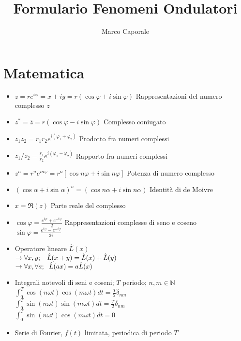 \documentclass[a4paper]{article}
\newcommand*{\field}[1]{\mathbb{#1}}
\begin{document}
	\title{Formulario Fenomeni Ondulatori}
	\author{Marco Caporale}
	\date{}
	\maketitle
\section{Matematica}
	\begin{itemize}
		\item $z = r e^{i \varphi} = x + iy = r(\cos \varphi + i \sin \varphi)$ Rappresentazioni del numero complesso $z$
		\item $z^*=\overline{z} = r(\cos \varphi - i \sin \varphi)$ Complesso coniugato
		\item $z_1 z_2 = r_1 r_2 e^{i (\varphi_1 +\varphi_2)}$ Prodotto fra numeri complessi
		\item $z_1/z_2 = \frac{r_1}{r_2} e^{i (\varphi_1 -\varphi_2)}$ Rapporto fra numeri complessi
		\item $z^n = r^n e^{in \varphi} = r^n [\cos n\varphi + i \sin n \varphi]$ Potenza di numero complesso
		\item $(\cos \alpha + i \sin \alpha)^n = (\cos n \alpha + i \sin n \alpha)$ Identità di de Moivre
		\item $x = \Re (z)$ Parte reale del complesso
		\item $\cos \varphi = \frac{e^{i \varphi}+e^{-i \varphi}}{2}$ Rappresentazioni complesse di seno e coseno\\
		$\sin \varphi = \frac{e^{i \varphi}-e^{-i \varphi}}{2i}$
		\item Operatore lineare $\hat{L}(x)$\\
		$\rightarrow \forall x,y; \hspace{3mm} \hat{L}(x+y)=\hat{L}(x) +\hat{L}(y)$\\
		$\rightarrow \forall x, \forall a; \hspace{2mm} \hat{L}(ax)= a\hat{L}(x)$
		\item Integrali notevoli di seni e coseni; $T$ periodo; $n,m \in \field{N}$ \\
		$\int_{0}^{T} \cos(n \omega t) \cos (m \omega t)dt = \frac{T}{2} \delta_{nm}$\\
		$\int_{0}^{T} \sin(n \omega t) \sin (m \omega t)dt = \frac{T}{2} \delta_{nm}$\\
		$\int_{0}^{T} \sin(n \omega t) \cos (m \omega t)dt = 0$
		\item Serie di Fourier, $f(t)$ limitata, periodica di periodo $T$\\

\end{itemize}
\end{document}

